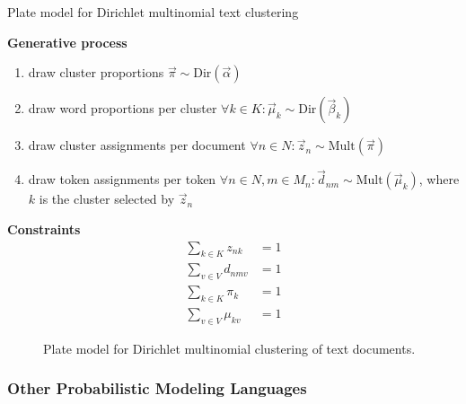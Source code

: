 \begin{Example} Plate model for Dirichlet multinomial text clustering
\label{ex:clustering-pm}

\textbf{Generative process}
\begin{enumerate}
\item draw cluster proportions $\vec \pi \sim \text{Dir}(\vec \alpha)$
\item draw word proportions per cluster $\forall k \in K: \vec \mu_k \sim \text{Dir}(\vec \beta_k)$
\item draw cluster assignments per document $\forall n \in N: \vec z_n \sim \text{Mult}(\vec \pi)$
\item draw token assignments per token $\forall n \in N, m \in M_n: \vec d_{nm} \sim \text{Mult}(\vec \mu_k)$, where $k$ is the cluster selected by $\vec z_n$
\end{enumerate}

\textbf{Constraints}
\begin{align}
\sum_{k \in K} z_{nk} &= 1\\
\sum_{v \in V} d_{nmv} &= 1\\
\sum_{k \in K} \pi_{k} &= 1\\
\sum_{v \in V} \mu_{kv} &= 1
\end{align}

\begin{figure}[t]
	\begin{center}
    	\scalebox{\tikzScale}{\adjustTikzSize }
	\end{center}
\caption{Plate model for Dirichlet multinomial clustering of text documents.}
		\label{fig:clustering_platemodel}
\end{figure}

\end{Example}

\subsubsection{Other Probabilistic Modeling Languages}

